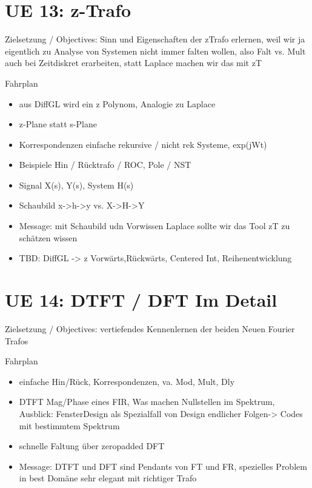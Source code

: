 \newpage
\section{UE 13: z-Trafo}
Zielsetzung / Objectives: Sinn und Eigenschaften der zTrafo erlernen, weil wir ja eigentlich zu Analyse von Systemen nicht immer falten wollen, also Falt vs. Mult auch bei Zeitdiskret erarbeiten, statt Laplace machen wir das mit zT

Fahrplan
\begin{itemize}
\item aus DiffGL wird ein z Polynom, Analogie zu Laplace
\item z-Plane statt s-Plane
\item Korrespondenzen einfache rekursive / nicht rek Systeme, exp(jWt)
\item Beispiele Hin / Rücktrafo / ROC, Pole / NST
\item Signal X(s), Y(s), System H(s)
\item Schaubild x->h->y vs. X->H->Y
\item Message: mit Schaubild udn Vorwissen Laplace sollte wir das Tool zT zu schätzen wissen
\item TBD: DiffGL -> z Vorwärts,Rückwärts, Centered Int, Reihenentwicklung
\end{itemize}


\newpage
\section{UE 14: DTFT / DFT Im Detail}
Zielsetzung / Objectives: vertiefendes Kennenlernen der beiden Neuen Fourier Trafos

Fahrplan
\begin{itemize}
\item einfache Hin/Rück, Korrespondenzen, va. Mod, Mult, Dly
\item DTFT Mag/Phase eines FIR, Was machen Nullstellen im Spektrum, Ausblick: FensterDesign als Spezialfall von Design endlicher Folgen-> Codes mit bestimmtem Spektrum
\item schnelle Faltung über zeropadded DFT
\item Message: DTFT und DFT sind Pendants von FT und FR, spezielles Problem in best Domäne sehr elegant mit richtiger Trafo
\end{itemize}



